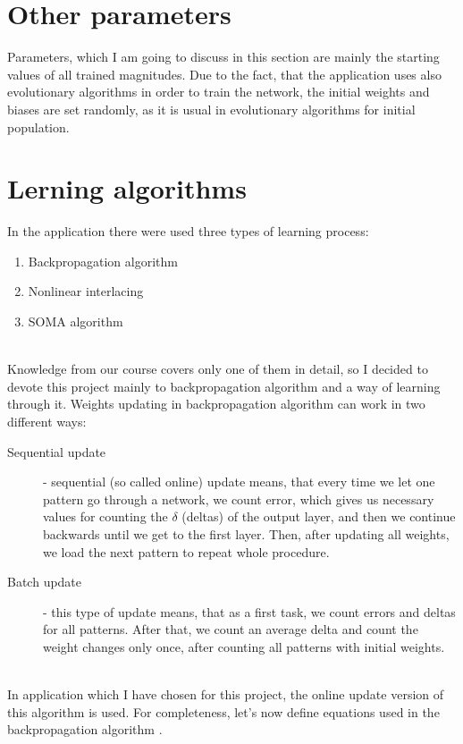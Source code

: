 \documentclass[a4paper,oneside,onecolumn,11pt]{report}
\begin{document}
	\section{Other parameters}
		Parameters, which I am going to discuss in this section are mainly the starting values of all
		trained magnitudes. Due to the fact, that the application uses also evolutionary algorithms 
		in order to train the network, the initial weights and biases are set randomly, as it is usual
		in evolutionary algorithms for initial population.

	\section{Lerning algorithms}
		In the application there were used three types of learning process:
		\begin{enumerate}
			\item Backpropagation algorithm
			\item Nonlinear interlacing
			\item SOMA algorithm
		\end{enumerate}\\

		Knowledge from our course covers only one of them in detail, so I decided to devote this
		project mainly to backpropagation algorithm and a way of learning through it. Weights updating 
		in backpropagation algorithm can work in two different ways:
		\begin{description}
			\item [Sequential update] - sequential (so called online) update means, that every time we let one pattern go through
			a network, we count error, which gives us necessary values for counting the $\delta$ (deltas)
			of the output layer, and then we continue backwards until we get to the first layer. Then,
			after updating all weights, we load the next pattern to repeat whole procedure.
			\item [Batch update] -  this type of update means, that as a first task, we count errors 
			and deltas for all patterns. After that, we count an average delta and count the weight 
			changes only once, after counting all patterns with initial weights. 
		\end{description}\\

		In application which I have chosen for this project, the online update version of this algorithm 
		is used. For completeness, let's now define equations used in the backpropagation algorithm \cite{Papadourakis2014}.
\end{document}
